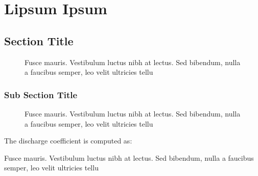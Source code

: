 \chapter{Lipsum Ipsum}
\label{ch01:chap01}



\lipsum[5]

\section{Section Title}
\label{ch01:sec3.1}

\lipsum[5]

\begin{figure}
{}
\caption{Fusce mauris. Vestibulum luctus nibh at lectus. Sed bibendum, nulla a faucibus semper, leo velit
ultricies tellu}
\end{figure}

\subsection{Sub Section Title}
\label{ch01:sec3.1.1}

\lipsum[5]

\begin{figure}
{\hspace*{-3pc}}
{\hspace*{-3pc}\begin{minipage}{33pc}
\caption{Fusce mauris. Vestibulum luctus nibh at lectus. Sed bibendum, nulla a faucibus semper, leo velit
ultricies tellu}
\end{minipage}}
\end{figure}

The discharge coefficient is computed as:

\begin{example}{\label{ch01:exa3.1}}
\lipsum[5]

\solution \lipsum[5]
\lipsum[5]

\begin{nboxfig}
{}
{Fusce mauris. Vestibulum luctus nibh at lectus. Sed bibendum, nulla a faucibus semper, leo velit
ultricies tellu}
\end{nboxfig}
\end{example}

\lipsum[5]
\lipsum[5]

